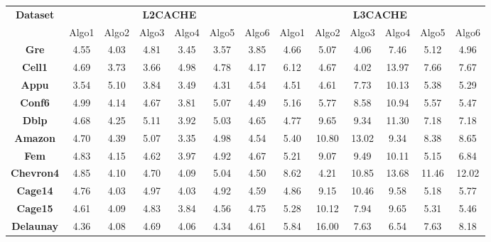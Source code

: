 \begin{itemize}
\begin{table}[th]
\begin{tabular}{ c|c|c|c|c|c|c|c|c|c|c|c|c| }
\hline
\multicolumn{1}{|c|}{\textbf{Dataset}} &
\multicolumn{6}{c}{\textbf{L2CACHE}} &
  \multicolumn{6}{|c|}{\textbf{L3CACHE}} \\
  \cline{2-13}
  \multicolumn{1}{|c|}{} &
  Algo1 & Algo2 & Algo3 & Algo4 & Algo5 & Algo6 & Algo1 & Algo2 & Algo3 & Algo4 & Algo5 & Algo6\\\hline
    \hline
  \multicolumn{1}{|c|}{\textbf{Gre}}
& 4.55 & 4.03 & 4.81 & \cellcolor{blue!25}3.45 & 3.57 & 3.85 & 4.66 & 5.07 & \cellcolor{green!25}4.06 & 7.46 & 5.12 & 4.96 \\ \hline
  \multicolumn{1}{|c|}{\textbf{Cell1}}
& 4.69 & 3.73 & \cellcolor{blue!25}3.66 & 4.98 & 4.78 & 4.17 & 6.12 & 4.67 & \cellcolor{green!25}4.02 & 13.97 & 7.66 & 7.67\\ \hline
  \multicolumn{1}{|c|}{\textbf{Appu}}
& 3.54 & 5.10 & 3.84 & \cellcolor{blue!25}3.49 & 4.31 & 4.54 & \cellcolor{green!25}4.51 & 4.61 & 7.73 & 10.13 & 5.38 & 5.29\\ \hline
\multicolumn{1}{|c|}{\textbf{Conf6}}
& 4.99 & 4.14 & 4.67 & \cellcolor{blue!25}3.81 & 5.07 & 4.49 & \cellcolor{green!25}5.16 & 5.77 & 8.58 & 10.94 & 5.57 & 5.47\\ \hline
  \multicolumn{1}{|c|}{\textbf{Dblp}}
& 4.68 & 4.25 & 5.11 & \cellcolor{blue!25}3.92 & 5.03 & 4.65 & \cellcolor{green!25}4.77 & 9.65 & 9.34 & 11.30 & 7.18 & 7.18\\ \hline
  \multicolumn{1}{|c|}{\textbf{Amazon}}
& 4.70 & 4.39 & 5.07 & \cellcolor{blue!25}3.35 & 4.98 & 4.54 & \cellcolor{green!25}5.40 & 10.80 & 13.02 & 9.34 & 8.38 & 8.65\\ \hline
  \multicolumn{1}{|c|}{\textbf{Fem}}
& 4.83 & 4.15 & 4.62 & \cellcolor{blue!25}3.97 & 4.92 & 4.67 & 5.21 & 9.07 & 9.49 & 10.11 & \cellcolor{green!25}5.15 & 6.84\\ \hline
  \multicolumn{1}{|c|}{\textbf{Chevron4}}
& 4.85 & 4.10 & 4.70 & \cellcolor{blue!25}4.09 & 5.04 & 4.50 & 8.62 & \cellcolor{green!25}4.21 & 10.85 & 13.68 & 11.46 & 12.02\\ \hline
  \multicolumn{1}{|c|}{\textbf{Cage14}}
& 4.76 & \cellcolor{blue!25}4.03 & 4.97 & 4.03 & 4.92 & 4.59 & \cellcolor{green!25}4.86 & 9.15 & 10.46 & 9.58 & 5.18 & 5.77\\ \hline
  \multicolumn{1}{|c|}{\textbf{Cage15}}
& 4.61 & 4.09 & 4.83 & \cellcolor{blue!25}3.84 & 4.56 & 4.75 & \cellcolor{green!25}5.28 & 10.12 & 7.94 & 9.65 & 5.31 & 5.46\\ \hline
  \multicolumn{1}{|c|}{\textbf{Delaunay}}
& 4.36 & 4.08 & 4.69 & \cellcolor{blue!25}4.06 & 4.34 & 4.61 & \cellcolor{green!25}5.84 & 16.00 & 7.63 & 6.54 & 7.63 & 8.18\\ \hline
\end{tabular}


\end{table}
\end{itemize}
